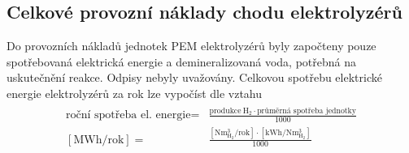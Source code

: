 \subsection{Celkové provozní náklady chodu elektrolyzérů}

Do provozních nákladů jednotek PEM elektrolyzérů byly započteny pouze spotřebovaná elektrická energie a demineralizovaná voda, potřebná na uskutečnění reakce. Odpisy nebyly uvažovány. Celkovou spotřebu elektrické energie elektrolyzérů za rok lze vypočíst dle vztahu
\begin{align}
    \begin{split}
        \mathrm{\text{roční spotřeba el. energie}} =& \frac{\mathrm{produkce\ H_2} \cdot \mathrm{\text{průměrná spotřeba jednotky}}}{1000} \\
        [\mathrm{MWh/rok}] =& \frac{[\mathrm{Nm^3_{H_2}/rok}]\cdot[\mathrm{kWh/Nm^3_{H_2}}]}{1000}
    \end{split}
\end{align}

